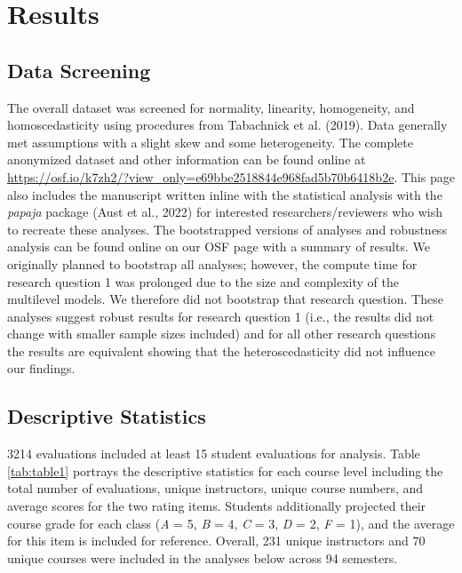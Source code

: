 \documentclass[
  man,mask]{apa7}
\begin{document}
\section{Results}\label{results}

\subsection{Data Screening}\label{data-screening}

The overall dataset was screened for normality, linearity, homogeneity,
and homoscedasticity using procedures from Tabachnick et al. (2019). Data
generally met assumptions with a slight skew and some heterogeneity. The
complete anonymized dataset and other information can be found online at
\url{https://osf.io/k7zh2/?view_only=e69bbe2518844e968fad5b70b6418b2e}. This page also includes the manuscript written
inline with the statistical analysis with the \emph{papaja} package
(Aust et al., 2022) for interested researchers/reviewers who wish to recreate
these analyses. The bootstrapped versions of analyses and robustness
analysis can be found online on our OSF page with a summary of results.
We originally planned to bootstrap all analyses; however, the compute
time for research question 1 was prolonged due to the size and
complexity of the multilevel models. We therefore did not bootstrap that
research question. These analyses suggest robust results for research
question 1 (i.e., the results did not change with smaller sample sizes
included) and for all other research questions the results are
equivalent showing that the heteroscedasticity did not influence our
findings.

\subsection{Descriptive Statistics}\label{descriptive-statistics}

3214 evaluations included at least 15 student evaluations
for analysis. Table \ref{tab:table1} portrays the descriptive
statistics for each course level including the total number of
evaluations, unique instructors, unique course numbers, and average
scores for the two rating items. Students additionally projected their
course grade for each class (\emph{A} = 5, \emph{B} = 4, \emph{C} = 3, \emph{D} = 2, \emph{F} =
1), and the average for this item is included for reference. Overall,
231 unique instructors and
70 unique courses were included in
the analyses below across 94
semesters.
\end{document}

